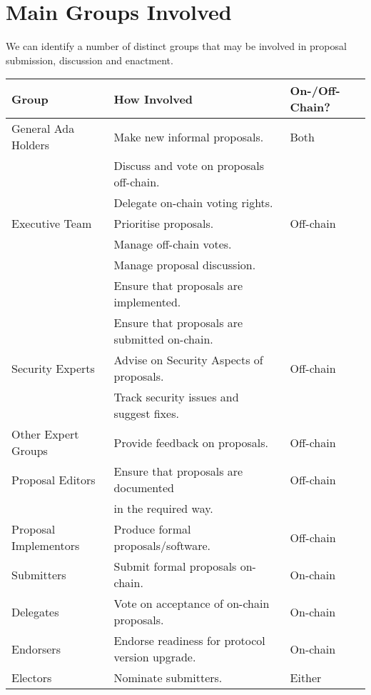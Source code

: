 \section{Main Groups Involved}

We can identify a number of distinct groups that may be involved in proposal submission, discussion and enactment.

\begin{tabular}{||l|l|l||}
  \hline \hline
  \textbf{Group} & \textbf{How Involved} & \textbf{On-/Off-Chain?}\\
  \hline
  General Ada Holders  & Make new informal proposals. & Both \\
                       & Discuss and vote on proposals off-chain. & \\
  			               & Delegate on-chain voting rights. & \\
  \hline
  Executive Team  & Prioritise proposals. & Off-chain \\
                       & Manage off-chain votes. & \\
                       & Manage proposal discussion. & \\
  			               & Ensure that proposals are implemented. & \\
  			               & Ensure that proposals are submitted on-chain. & \\
  \hline
  Security Experts			       & Advise on Security Aspects of proposals. & Off-chain \\
                               & Track security issues and suggest fixes. & \\
  \hline
  Other Expert Groups			       & Provide feedback on proposals. & Off-chain \\
  \hline
  Proposal Editors			   & Ensure that proposals are documented & Off-chain \\
                     & in the required way. &  \\
  \hline
  Proposal Implementors			   & Produce formal proposals/software. & Off-chain\\
  \hline
  Submitters				   & Submit formal proposals on-chain. & On-chain \\
  \hline
  Delegates				   & Vote on acceptance of on-chain proposals. & On-chain \\
  \hline
  Endorsers			   & Endorse readiness for protocol version upgrade. & On-chain\\
  \hline
  Electors			       & Nominate submitters. & Either \\
  \hline \hline
\end{tabular}

